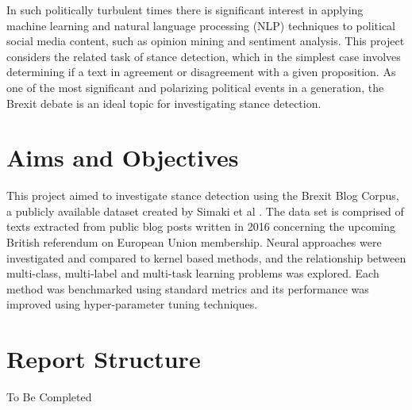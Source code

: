 \documentclass[Dissertation.tex]{subfiles}
\begin{document}
In such politically turbulent times there is significant interest in applying machine learning and natural language processing (NLP) techniques to political social media content, such as opinion mining and sentiment analysis. This project considers the related task of stance detection, which in the simplest case involves determining if a text in agreement or disagreement with a given proposition. As one of the most significant and polarizing political events in a generation, the Brexit debate is an ideal topic for investigating stance detection.

\section{Aims and Objectives}
This project aimed to investigate stance detection using the Brexit Blog Corpus, a publicly available dataset created by Simaki et al \cite{simakiAnnotatingSpeakerStance2017}. The data set is comprised of texts extracted from public blog posts written in 2016 concerning the upcoming British referendum on European Union membership. Neural approaches were investigated and compared to kernel based methods, and the relationship between multi-class, multi-label and multi-task learning problems was explored. Each method was benchmarked using standard metrics and its performance was improved using hyper-parameter tuning techniques.

\section{Report Structure}
To Be Completed

\end{document}
